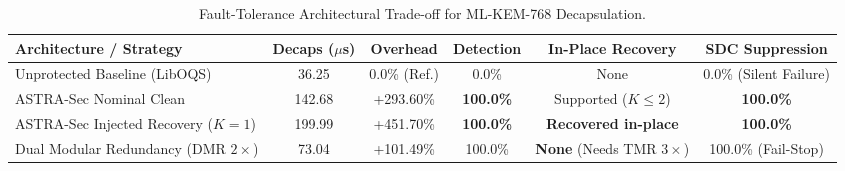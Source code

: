 \begin{table}[t]
\centering
\caption{Fault-Tolerance Architectural Trade-off for ML-KEM-768 Decapsulation.}
\label{tab:fault_tolerance_tradeoff}
\small
\begin{tabular}{lccccc}
\hline
\textbf{Architecture / Strategy} & \textbf{Decaps ($\mu$s)} & \textbf{Overhead} & \textbf{Detection} & \textbf{In-Place Recovery} & \textbf{SDC Suppression} \\
\hline
Unprotected Baseline (LibOQS) & 36.25 & 0.0\% (Ref.) & 0.0\% & None & 0.0\% (Silent Failure) \\
ASTRA-Sec Nominal Clean & 142.68 & +293.60\% & \textbf{100.0\%} & Supported ($K \le 2$) & \textbf{100.0\%} \\
ASTRA-Sec Injected Recovery ($K=1$) & 199.99 & +451.70\% & \textbf{100.0\%} & \textbf{Recovered in-place} & \textbf{100.0\%} \\
Dual Modular Redundancy (DMR $2\times$) & 73.04 & +101.49\% & 100.0\% & \textbf{None} (Needs TMR $3\times$) & 100.0\% (Fail-Stop) \\
\hline
\end{tabular}
\end{table}
